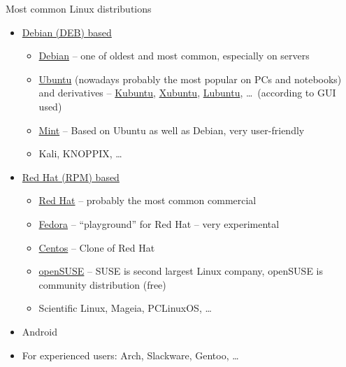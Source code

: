 \documentclass[compress, ucs, xelatex, 11pt, xcolor=svgnames,
  hyperref={
    bookmarks=true,
    unicode=true,
    colorlinks=true,
    pdftitle={Linux, command line and MetaCentrum},
    plainpages=false,
    pdfauthor={Vojtech Zeisek},
    pdfsubject={Course about use of Linux command line, writing shell scripts and using MetaCentrum of CESNET},
    pdfcreator={XeLaTeX},
    pdfkeywords={Linux, GNU, BASH, shell, command line, MetaCentrum},
    linkcolor=Red,
    anchorcolor=Blue,
    citecolor=Purple,
    filecolor=DodgerBlue,
    menucolor=DarkOrchid,
    urlcolor=DeepSkyBlue,
    pdftex},
  url={hyphens, lowtilde} %
  ]{beamer}
\begin{document}
\begin{frame}{Most common Linux distributions}
\begin{itemize}
  \item \href{http://distrowatch.com/search.php?package=DEB}{Debian (DEB) based}
  \begin{itemize}
    \item \href{https://www.debian.org/}{Debian} -- one of oldest and most common, especially on servers
    \item \href{http://www.ubuntu.com/}{Ubuntu} (nowadays probably the most popular on PCs and notebooks) and derivatives -- \href{https://www.kubuntu.org/}{Kubuntu}, \href{https://xubuntu.org/}{Xubuntu}, \href{http://lubuntu.net/}{Lubuntu}, \ldots~(according to GUI used)
    \item \href{http://linuxmint.com/}{Mint} -- Based on Ubuntu as well as Debian, very user-friendly
    \item Kali, KNOPPIX, \ldots
  \end{itemize}
  \item \href{http://distrowatch.com/search.php?package=RPM}{Red Hat (RPM) based}
  \begin{itemize}
    \item \href{https://www.redhat.com/}{Red Hat} -- probably the most common commercial
    \item \href{https://getfedora.org/}{Fedora} -- ``playground'' for Red Hat -- very experimental
    \item \href{https://www.centos.org/}{Centos} -- Clone of Red Hat
    \item \href{https://www.opensuse.org/}{openSUSE} -- SUSE is second largest Linux company, openSUSE is community distribution (free)
    \item Scientific Linux, Mageia, PCLinuxOS, \ldots
  \end{itemize}
  \item Android
  \item For experienced users: Arch, Slackware, Gentoo, \ldots
\end{itemize}
\end{frame}
\end{document}
